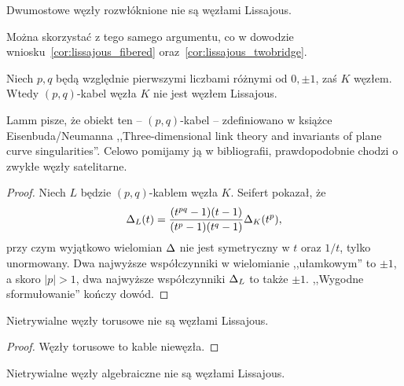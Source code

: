 \begin{corollary}
%
%
    Dwumostowe węzły rozwłóknione nie są węzłami Lissajous.
\end{corollary}

Można skorzystać z tego samego argumentu, co w dowodzie wniosku~\ref{cor:lissajous_fibered} oraz~\ref{cor:lissajous_twobridge}.

\begin{proposition}
    Niech $p, q$ będą względnie pierwszymi liczbami różnymi od $0, \pm 1$, zaś $K$ węzłem.
    Wtedy $(p, q)$-kabel węzła $K$ nie jest węzłem Lissajous.
\end{proposition}

Lamm pisze, że obiekt ten -- $(p, q)$-kabel -- zdefiniowano w książce Eisenbuda/Neumanna ,,Three-dimensional link theory and invariants of plane curve singularities''.
%
%
Celowo pomijamy ją w bibliografii, prawdopodobnie chodzi o zwykłe węzły satelitarne.
%

\begin{proof}
    Niech $L$ będzie $(p, q)$-kablem węzła $K$.
    Seifert \cite{seifert1950} pokazał, że
%
    \begin{equation}
        \Delta_L(t) = \frac{(t^{pq}-1)(t-1)}{(t^p-1)(t^q-1)} \Delta_K(t^p),
    \end{equation}
    przy czym wyjątkowo wielomian $\Delta$ nie jest symetryczny w $t$ oraz $1/t$, tylko unormowany.
    Dwa najwyższe współczynniki w wielomianie ,,ułamkowym'' to $\pm 1$, a skoro $|p| > 1$, dwa najwyższe współczynniki $\Delta_L$ to także $\pm 1$.
    ,,Wygodne sformułowanie'' kończy dowód.
\end{proof}

\begin{corollary}
%
    Nietrywialne węzły torusowe nie są węzłami Lissajous.
\end{corollary}

\begin{proof}
    Węzły torusowe to kable niewęzła.
%
\end{proof}

\begin{corollary}
    Nietrywialne węzły algebraiczne nie są węzłami Lissajous.
%
\end{corollary}

